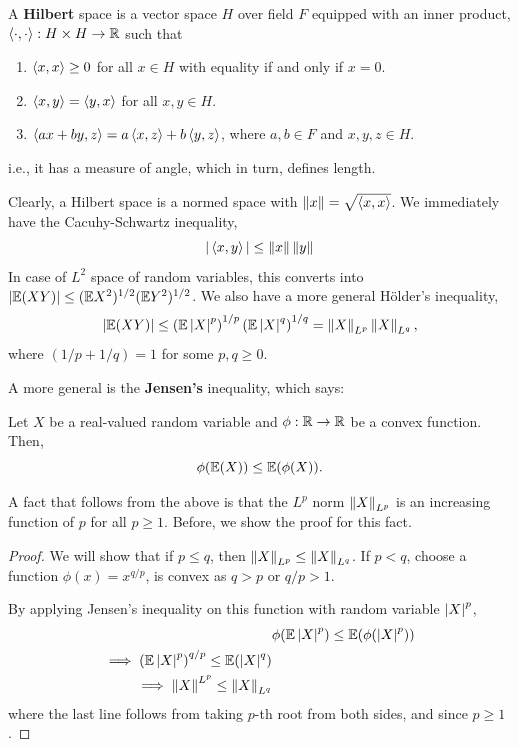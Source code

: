 \documentclass[12pt]{article}
\begin{document}
\begin{definitionbox}
    A \textbf{Hilbert} space is a vector space $H$ over field $F$ equipped with an inner product, $\left\langle \cdot,\cdot \right\rangle : H \times H \rightarrow \mathbb{R}$ such that
    \begin{enumerate}
        \item $\left\langle x, x \right\rangle \geq 0$ for all $x \in H$ with equality if and only if $x = 0$.
        \item $\left\langle x, y \right\rangle = \left\langle y, x \right\rangle$ for all $x, y \in H$.
        \item $\left\langle ax + by, z \right\rangle = a\left\langle x, z \right\rangle + b\left\langle y, z \right\rangle$, where $a, b\in F$ and $x, y, z \in H$.
    \end{enumerate}
    \noindent i.e., it has a measure of angle, which in turn, defines length.
\end{definitionbox}

Clearly, a Hilbert space is a normed space with $\left\Vert x \right\Vert = \sqrt{\left\langle x, x \right\rangle}$. We immediately have the Cacuhy-Schwartz inequality,
\begin{equation*}
    \vert \left\langle x,y \right\rangle \vert \leq \left\Vert x \right\Vert\left\Vert y \right\Vert
\end{equation*}
\noindent In case of $L^2$ space of random variables, this converts into $\vert \mathbb{E}(XY)\vert \leq (\mathbb{E} X^2)^{1/2} (\mathbb{E} Y^2)^{1/2}$. We also have a more general H\"{o}lder's inequality,
\begin{equation*}
    \vert \mathbb{E}(XY)\vert \leq \left( \mathbb{E}\left\lvert X \right\rvert^p \right)^{1/p} \left( \mathbb{E}\left\lvert X \right\rvert^q \right)^{1/q} = \left\Vert X \right\Vert_{L^p} \left\Vert X \right\Vert_{L^q},
\end{equation*}
\noindent where $(1/p + 1/q) = 1$ for some $p, q \geq 0$.

A more general is the \textbf{Jensen's} inequality, which says:
\begin{theorembox}
    Let $X$ be a real-valued random variable and $\phi: \mathbb{R} \rightarrow \mathbb{R}$ be a convex function. Then,
    \begin{equation*}
        \phi(\mathbb{E}(X)) \leq \mathbb{E}(\phi(X)).
    \end{equation*}
\end{theorembox}
\noindent A fact that follows from the above is that the $L^p$ norm $\left\Vert X \right\Vert_{L^p}$ is an increasing function of $p$ for all $p \geq 1$. Before, we show the proof for this fact.

\begin{proof}
    We will show that if $p \leq q$, then $\left\Vert X \right\Vert_{L^p} \leq \left\Vert X \right\Vert_{L^q}$. If $p < q$, choose a function $\phi(x) = x^{q/p}$, is convex as $q > p$ or $q/p > 1$.

    By applying Jensen's inequality on this function with random variable $\left\lvert X \right\rvert^p$,
    \begin{align*}
         & \phi(\mathbb{E}\left\lvert X \right\rvert^p) \leq \mathbb{E}(\phi(\left\lvert X \right\rvert^p))                \\
        \implies \left( \mathbb{E}\left\lvert X \right\rvert^p \right)^{q/p} \leq \mathbb{E}(\left\lvert X \right\rvert^q) \\
        \implies \left\Vert X \right\Vert^{L^p} \leq \left\Vert X \right\Vert_{L^q}
    \end{align*}
    \noindent where the last line follows from taking $p$-th root from both sides, and since $p \geq 1$.
\end{proof}
\end{document}
